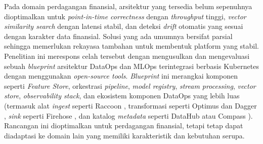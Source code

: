 Pada domain perdagangan finansial, arsitektur yang tersedia belum sepenuhnya dioptimalkan untuk \textit{point-in-time correctness} dengan \textit{throughput} tinggi, \textit{vector similarity search} dengan latensi stabil, dan deteksi \textit{drift} otomatis yang sesuai dengan karakter data finansial. Solusi yang ada umumnya bersifat parsial sehingga memerlukan rekayasa tambahan untuk membentuk platform yang stabil. Penelitian ini merespons celah tersebut dengan mengusulkan dan mengevaluasi sebuah \textit{blueprint} arsitektur DataOps dan MLOps terintegrasi berbasis Kubernetes dengan menggunakan \textit{open-source tools}. \textit{Blueprint} ini merangkai komponen seperti \textit{Feature Store}, orkestrasi \textit{pipeline}, \textit{model registry}, \textit{stream processing}, \textit{vector store}, \textit{observability stack}, dan ekosistem komponen DataOps yang lebih luas (termasuk alat \textit{ingest} seperti Raccoon \autocite{raystack2025raccoon}, transformasi seperti Optimus \autocite{raystack2025optimus} dan Dagger \autocite{raystack2025dagger}, \textit{sink} seperti Firehose \autocite{raystack2025firehose}, dan katalog \textit{metadata} seperti DataHub atau Compass \autocite{raystack2025compass}). Rancangan ini dioptimalkan untuk perdagangan finansial, tetapi tetap dapat diadaptasi ke domain lain yang memiliki karakteristik dan kebutuhan serupa.
